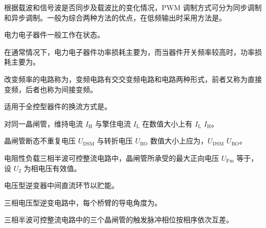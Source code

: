 \documentclass[电力电子]{subfiles}
\begin{document}
\begin{ti}
	根据载波和信号波是否同步及载波比的变化情况，PWM 调制方式可分为同步调制和异步调制。一般为综合两种方法的优点，在低频输出时采用方法是。
\end{ti}

\begin{ti}
	电力电子器件一般工作在状态。
\end{ti}

\begin{ti}
	在通常情况下，电力电子器件功率损耗主要为，而当器件开关频率较高时，功率损耗主要为。
\end{ti}

\begin{ti}
	改变频率的电路称为，变频电路有交交变频电路和电路两种形式，前者又称为直接变频，后者也称为间接变频。
\end{ti}

\begin{ti}
	适用于全控型器件的换流方式是。
\end{ti}

\begin{ti}
	对同一晶闸管，维持电流 $I_{\mathrm{H}}$ 与擎住电流 $I_{\mathrm{L}}$ 在数值大小上有 $I_{\mathrm{L}}$ $I_{\mathrm{H}}$。
\end{ti}

\begin{ti}
	晶闸管断态不重复电压 $U_{\mathrm{DSM}}$ 与转折电压 $U_{\mathrm{BO}}$ 数值大小上应为，$U_{\mathrm{DSM}}$  $U_{\mathrm{BO}}$。
\end{ti}

\begin{ti}
	电阻性负载三相半波可控整流电路中，晶闸管所承受的最大正向电压 $U_{\mathrm{Fm}}$ 等于，设 $U_{2}$ 为相电压有效值。
\end{ti}

\begin{ti}
	电压型逆变器中间直流环节以贮能。
\end{ti}

\begin{ti}
	三相电压型逆变电路中，每个桥臂的导电角度为。
\end{ti}

\begin{ti}
	三相半波可控整流电路中的三个晶闸管的触发脉冲相位按相序依次互差。
\end{ti}
\end{document}
